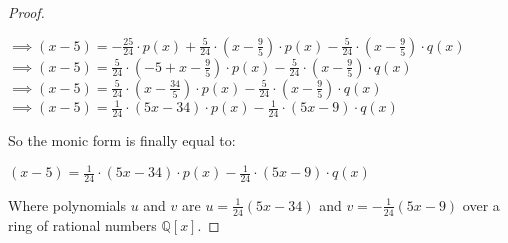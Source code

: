 \documentclass[a4paper]{article}
\begin{document}
\begin{proof}
\begin{center}
$\implies (x-5) = -\frac{25}{24} \cdot p(x) + \frac{5}{24} \cdot (x - \frac{9}{5}) \cdot p(x) - \frac{5}{24} \cdot (x - \frac{9}{5}) \cdot q(x)$ \\
$\implies (x-5) = \frac{5}{24} \cdot (-5 + x - \frac{9}{5}) \cdot p(x) - \frac{5}{24} \cdot (x - \frac{9}{5}) \cdot q(x)$\\
$\implies (x-5) = \frac{5}{24} \cdot (x - \frac{34}{5}) \cdot p(x) - \frac{5}{24} \cdot (x - \frac{9}{5}) \cdot q(x)$\\
$\implies (x-5) = \frac{1}{24} \cdot (5x - 34) \cdot p(x) - \frac{1}{24} \cdot (5x - 9) \cdot q(x)$
\end{center}
So the monic form is finally equal to:
\begin{center}
$ (x-5) = \frac{1}{24} \cdot (5x - 34) \cdot p(x) - \frac{1}{24} \cdot (5x - 9) \cdot q(x)$
\end{center}
Where polynomials $u$ and $v$ are $u=\frac{1}{24}(5x - 34)$ and $v=-\frac{1}{24}(5x - 9)$ over a ring of rational numbers $\mathbb{Q}[x]$.
\end{proof}
\end{document}
